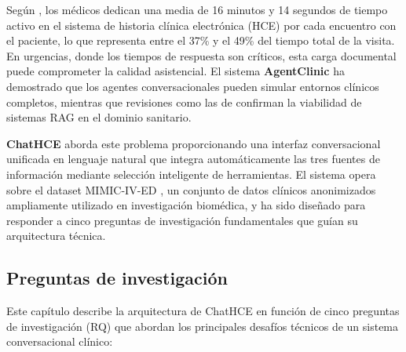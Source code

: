 Según \textcite{arun2025ethical}, los médicos dedican una media de 16 minutos y 14 segundos de tiempo activo en el sistema de historia clínica electrónica (\acs{HCE}) por cada encuentro con el paciente, lo que representa entre el 37\% y el 49\% del tiempo total de la visita. En urgencias, donde los tiempos de respuesta son críticos, esta carga documental puede comprometer la calidad asistencial. El sistema \textbf{AgentClinic} \parencite{AgentClinic2025} ha demostrado que los agentes conversacionales pueden simular entornos clínicos completos, mientras que revisiones como las de \textcite{Amugongo2025systematic} confirman la viabilidad de sistemas \ac{RAG} en el dominio sanitario.

\textbf{ChatHCE} aborda este problema proporcionando una interfaz conversacional unificada en lenguaje natural que integra automáticamente las tres fuentes de información mediante selección inteligente de herramientas. El sistema opera sobre el dataset \acs{MIMIC}-IV-\acs{ED} \parencite{johnson2023mimiciv}, un conjunto de datos clínicos anonimizados ampliamente utilizado en investigación biomédica, y ha sido diseñado para responder a cinco preguntas de investigación fundamentales que guían su arquitectura técnica.

\subsection{Preguntas de investigación}

Este capítulo describe la arquitectura de ChatHCE en función de cinco preguntas de investigación (\acs{RQ}) que abordan los principales desafíos técnicos de un sistema conversacional clínico:

